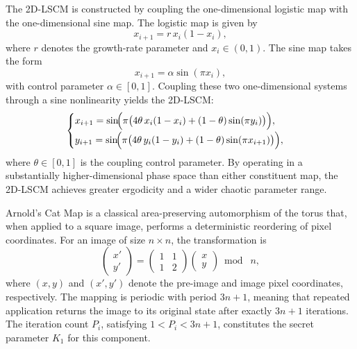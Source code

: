 The 2D-LSCM is constructed by coupling the one-dimensional logistic map with the one-dimensional sine map. The logistic map is given by
\begin{equation}
    x_{i+1} = r\, x_i(1 - x_i),
\end{equation}
where $r$ denotes the growth-rate parameter and $x_i \in (0,1)$. The sine map takes the form
\begin{equation}
    x_{i+1} = \alpha \sin(\pi x_i),
\end{equation}
with control parameter $\alpha \in [0,1]$. Coupling these two one-dimensional systems through a sine nonlinearity yields the 2D-LSCM:
\begin{equation}
\begin{cases}
x_{i+1} = \sin\!\Bigl(\pi\bigl(4\theta\, x_i(1-x_i) + (1-\theta)\sin(\pi y_i)\bigr)\Bigr),\\[4pt]
y_{i+1} = \sin\!\Bigl(\pi\bigl(4\theta\, y_i(1-y_i) + (1-\theta)\sin(\pi x_{i+1})\bigr)\Bigr),
\end{cases}
\end{equation}
where $\theta \in [0,1]$ is the coupling control parameter. By operating in a substantially higher-dimensional phase space than either constituent map, the 2D-LSCM achieves greater ergodicity and a wider chaotic parameter range.


Arnold's Cat Map is a classical area-preserving automorphism of the torus that, when applied to a square image, performs a deterministic reordering of pixel coordinates. For an image of size $n \times n$, the transformation is
\begin{equation}
\begin{pmatrix} x' \\ y' \end{pmatrix}
=
\begin{pmatrix} 1 & 1 \\ 1 & 2 \end{pmatrix}
\begin{pmatrix} x \\ y \end{pmatrix} \bmod\; n,
\end{equation}
where $(x,y)$ and $(x',y')$ denote the pre-image and image pixel coordinates, respectively. The mapping is periodic with period $3n+1$, meaning that repeated application returns the image to its original state after exactly $3n+1$ iterations. The iteration count $P_i$, satisfying $1 < P_i < 3n+1$, constitutes the secret parameter $K_1$ for this component.

